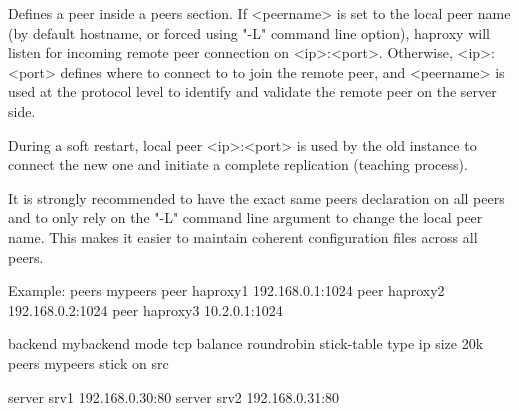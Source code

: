 Defines a peer inside a peers section.
If <peername> is set to the local peer name (by default hostname, or forced
using "-L" command line option), haproxy will listen for incoming remote peer
connection on <ip>:<port>. Otherwise, <ip>:<port> defines where to connect to
to join the remote peer, and <peername> is used at the protocol level to
identify and validate the remote peer on the server side.

During a soft restart, local peer <ip>:<port> is used by the old instance to
connect the new one and initiate a complete replication (teaching process).

It is strongly recommended to have the exact same peers declaration on all
peers and to only rely on the "-L" command line argument to change the local
peer name. This makes it easier to maintain coherent configuration files
across all peers.

\begin{example}{Example:}
    peers mypeers
        peer haproxy1 192.168.0.1:1024
        peer haproxy2 192.168.0.2:1024
        peer haproxy3 10.2.0.1:1024

    backend mybackend
        mode tcp
        balance roundrobin
        stick-table type ip size 20k peers mypeers
        stick on src

        server srv1 192.168.0.30:80
        server srv2 192.168.0.31:80
\end{example}
